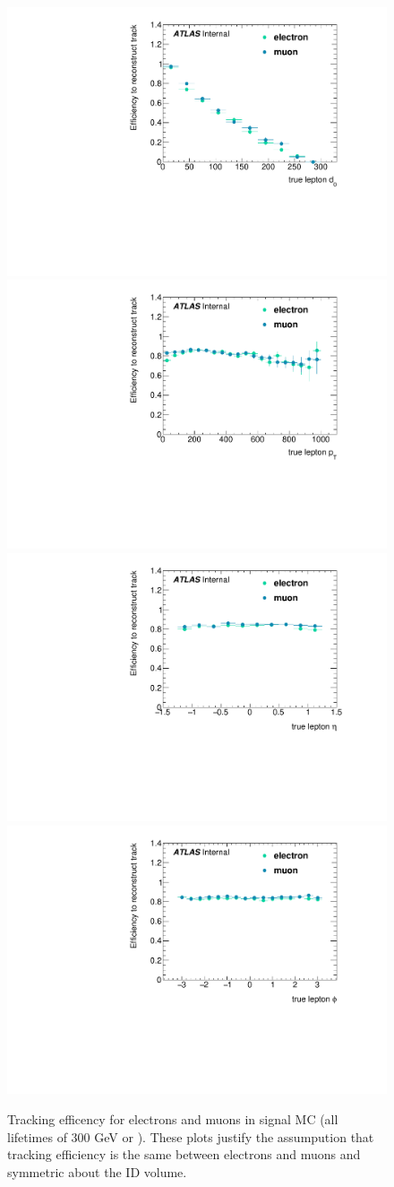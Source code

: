 \begin{figure}[htbp]
\centering
\includegraphics[width=.48\textwidth]{figures/LRT_systs/stlrt_compare_elmu_d0.pdf}
\includegraphics[width=.48\textwidth]{figures/LRT_systs/stlrt_compare_elmu_pt.pdf}
\includegraphics[width=.48\textwidth]{figures/LRT_systs/stlrt_compare_elmu_eta.pdf}
\includegraphics[width=.48\textwidth]{figures/LRT_systs/stlrt_compare_elmu_phi.pdf}
\caption{Tracking efficency for electrons and muons in signal MC (all lifetimes of 300 GeV \selec or \smu). These plots justify the assumpution that tracking efficiency is the same between electrons and muons and symmetric about the \ac{ID} volume.}
\label{fig:trk_el_mu}
\end{figure}

